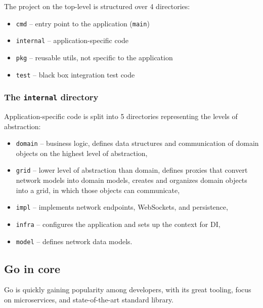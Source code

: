 The project on the top-level is structured over 4 directories:

\begin{itemize}
	\item
	      \texttt{cmd} -- entry point to the application (\texttt{main})
	\item
	      \texttt{internal} -- application-specific code
	\item
	      \texttt{pkg} -- reusable utils, not specific to the application
	\item
	      \texttt{test} -- black box integration test code
\end{itemize}

\hypertarget{the-internal-directory}{%
	\subsubsection{\texorpdfstring{The \texttt{internal}
		directory}{The internal directory}}\label{the-internal-directory}}

Application-specific code is split into 5 directories representing the
levels of abstraction:

\begin{itemize}
	\item
	      \texttt{domain} -- business logic, defines data structures and
	      communication of domain objects on the highest level of abstraction,
	\item
	      \texttt{grid} -- lower level of abstraction than domain, defines
	      proxies that convert network models into domain models, creates and
	      organizes domain objects into a grid, in which those objects can
	      communicate,
	\item
	      \texttt{impl} -- implements network endpoints, WebSockets, and
	      persistence,
	\item
	      \texttt{infra} -- configures the application and sets up the context
	      for DI,
	\item
	      \texttt{model} -- defines network data models.
\end{itemize}

\hypertarget{go-in-core}{%
	\subsection{Go in core}\label{go-in-core}}

Go is quickly gaining popularity among developers, with its great
tooling, focus on microservices, and state-of-the-art standard library.

